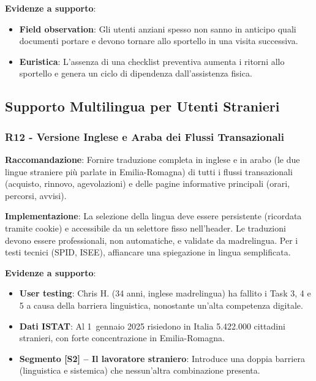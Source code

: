 \documentclass[11pt,a4paper]{article}
\begin{document}
\textbf{Evidenze a supporto}:
\begin{itemize}
    \item \textbf{Field observation}: Gli utenti anziani spesso non sanno in
    anticipo quali documenti portare e devono tornare allo sportello in una
    visita successiva.
    \item \textbf{Euristica}: L'assenza di una checklist preventiva aumenta
    i ritorni allo sportello e genera un ciclo di dipendenza dall'assistenza
    fisica.
\end{itemize}



\subsection{Supporto Multilingua per Utenti Stranieri}

\subsubsection{R12 - Versione Inglese e Araba dei Flussi Transazionali}
\label{rec:R12}

\textbf{Raccomandazione}: Fornire traduzione completa in inglese e in arabo
(le due lingue straniere pi\`u parlate in Emilia-Romagna) di tutti i flussi
transazionali (acquisto, rinnovo, agevolazioni) e delle pagine informative
principali (orari, percorsi, avvisi).

\textbf{Implementazione}: La selezione della lingua deve essere persistente
(ricordata tramite cookie) e accessibile da un selettore fisso nell'header.
Le traduzioni devono essere professionali, non automatiche, e validate da
madrelingua. Per i testi tecnici (SPID, ISEE), affiancare una spiegazione
in lingua semplificata.

\textbf{Evidenze a supporto}:
\begin{itemize}
    \item \textbf{User testing}: Chris H. (34 anni, inglese madrelingua) ha
    fallito i Task 3, 4 e 5 a causa della barriera linguistica, nonostante
    un'alta competenza digitale.
    \item \textbf{Dati ISTAT}: Al 1\textdegree\ gennaio 2025 risiedono in Italia 5.422.000
    cittadini stranieri, con forte concentrazione in Emilia-Romagna.
    \item \textbf{Segmento [S2] -- Il lavoratore straniero}: Introduce
    una doppia barriera (linguistica e sistemica) che nessun'altra
    combinazione presenta.
\end{itemize}
\end{document}
